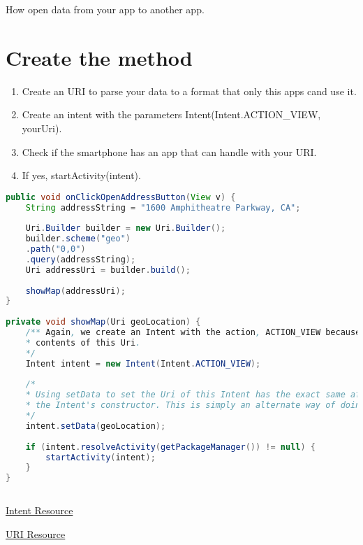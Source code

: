 \documentclass[12pt]{article} %
\begin{document}
	How open data from your app to another app.
	
	
	\section{Create the method}
	
	\begin{enumerate}
		\item Create an URI to parse your data to a format that only this apps cand use it.
		\item Create an intent with the parameters Intent(Intent.ACTION\_VIEW, yourUri).
		\item Check if the smartphone has an app that can handle with your URI.
		\item If yes, startActivity(intent).
	\end{enumerate}
	
	\begin{lstlisting}[language=Java]
public void onClickOpenAddressButton(View v) {
	String addressString = "1600 Amphitheatre Parkway, CA";
	
	Uri.Builder builder = new Uri.Builder();
	builder.scheme("geo")
	.path("0,0")
	.query(addressString);
	Uri addressUri = builder.build();
	
	showMap(addressUri);
}
	
private void showMap(Uri geoLocation) {
	/** Again, we create an Intent with the action, ACTION_VIEW because we want to VIEW the
	* contents of this Uri.
	*/
	Intent intent = new Intent(Intent.ACTION_VIEW);
	
	/*
	* Using setData to set the Uri of this Intent has the exact same affect as passing it in
	* the Intent's constructor. This is simply an alternate way of doing this.
	*/
	intent.setData(geoLocation);
	
	if (intent.resolveActivity(getPackageManager()) != null) {
		startActivity(intent);
	}
}
	
	\end{lstlisting}
	
	\href{https://developer.android.com/reference/android/content/Intent.html}{Intent Resource} 
	
	\href{https://developer.android.com/reference/android/net/Uri.html}{URI Resource}
	
	
\end{document}
